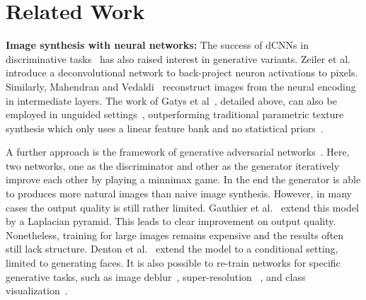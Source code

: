 \documentclass[10pt,twocolumn,letterpaper]{article}
\begin{document}
\section{Related Work}


\textbf{Image synthesis with neural networks:} 
The success of dCNNs in discriminative tasks~\cite{ILSVRC15} has also raised interest in generative variants. Zeiler et al.~\cite{Zeiler14} introduce a deconvolutional network to back-project neuron activations to pixels. Similarly, Mahendran and  Vedaldi~\cite{Mahendran15} reconstruct images from the neural encoding in intermediate layers. The work of Gatys et al~\cite{Gatys15}, detailed above, can also be employed in unguided settings~\cite{Gatys2015b}, outperforming traditional parametric texture synthesis which only uses a linear feature bank and no statistical priors~\cite{Portilla00}. %



A further approach is the framework of generative adversarial networks~\cite{Goodfellow2014}. Here, two networks, one as the discriminator and other as the generator iteratively improve each other by playing a minnimax game. In the end the generator is able to produces more natural images than naive image synthesis. However, in many cases the output quality is still rather limited. Gauthier et al.~\cite{Gauthier15} extend this model by a Laplacian pyramid. This leads to clear improvement on output quality. Nonetheless, training for large images remains expensive and the results often still lack structure. Denton et al.~\cite{Denton15} extend the model to a conditional setting, limited to generating faces. It is also possible to re-train networks for specific generative tasks, such as image deblur~\cite{Xu15}, super-resolution ~\cite{Dong15}, and class visualization~\cite{Lu15}. 
\end{document}
